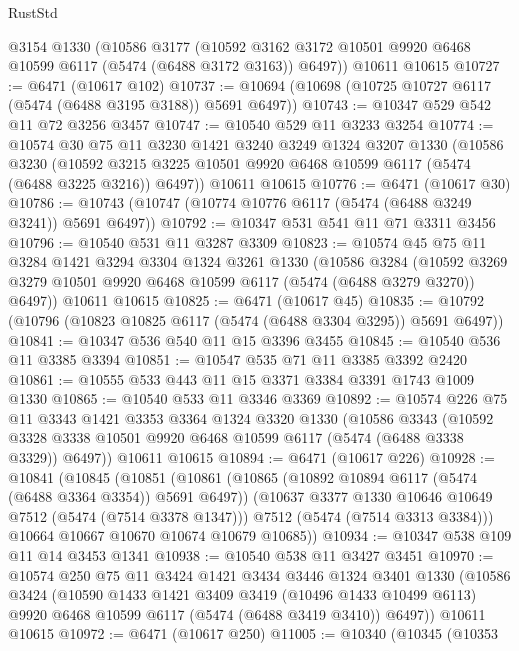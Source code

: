 \begin{lexlean}{RustStd}
\begin{coremodule}
    @3154
    @1330
    (@10586
      @3177
      (@10592 @3162 @3172 @10501 @9920 @6468 @10599 @6117 (@5474 (@6488 @3172 @3163)) @6497))
    @10611
    @10615
@10727 := @6471 (@10617 @102)
@10737 := @10694 (@10698 (@10725 @10727 @6117 (@5474 (@6488 @3195 @3188)) @5691 @6497))
@10743 := @10347 @529 @542 @11 @72 @3256 @3457
@10747 := @10540 @529 @11 @3233 @3254
@10774 := @10574
    @30
    @75
    @11
    @3230
    @1421
    @3240
    @3249
    @1324
    @3207
    @1330
    (@10586
      @3230
      (@10592 @3215 @3225 @10501 @9920 @6468 @10599 @6117 (@5474 (@6488 @3225 @3216)) @6497))
    @10611
    @10615
@10776 := @6471 (@10617 @30)
@10786 := @10743 (@10747 (@10774 @10776 @6117 (@5474 (@6488 @3249 @3241)) @5691 @6497))
@10792 := @10347 @531 @541 @11 @71 @3311 @3456
@10796 := @10540 @531 @11 @3287 @3309
@10823 := @10574
    @45
    @75
    @11
    @3284
    @1421
    @3294
    @3304
    @1324
    @3261
    @1330
    (@10586
      @3284
      (@10592 @3269 @3279 @10501 @9920 @6468 @10599 @6117 (@5474 (@6488 @3279 @3270)) @6497))
    @10611
    @10615
@10825 := @6471 (@10617 @45)
@10835 := @10792 (@10796 (@10823 @10825 @6117 (@5474 (@6488 @3304 @3295)) @5691 @6497))
@10841 := @10347 @536 @540 @11 @15 @3396 @3455
@10845 := @10540 @536 @11 @3385 @3394
@10851 := @10547 @535 @71 @11 @3385 @3392 @2420
@10861 := @10555 @533 @443 @11 @15 @3371 @3384 @3391 @1743 @1009 @1330
@10865 := @10540 @533 @11 @3346 @3369
@10892 := @10574
    @226
    @75
    @11
    @3343
    @1421
    @3353
    @3364
    @1324
    @3320
    @1330
    (@10586
      @3343
      (@10592 @3328 @3338 @10501 @9920 @6468 @10599 @6117 (@5474 (@6488 @3338 @3329)) @6497))
    @10611
    @10615
@10894 := @6471 (@10617 @226)
@10928 := @10841
    (@10845
      (@10851
        (@10861
          (@10865 (@10892 @10894 @6117 (@5474 (@6488 @3364 @3354)) @5691 @6497))
          (@10637 @3377 @1330 @10646 @10649 @7512 (@5474 (@7514 @3378 @1347)))
          @7512
          (@5474 (@7514 @3313 @3384)))
        @10664
        @10667
        @10670
        @10674
        @10679
        @10685))
@10934 := @10347 @538 @109 @11 @14 @3453 @1341
@10938 := @10540 @538 @11 @3427 @3451
@10970 := @10574
    @250
    @75
    @11
    @3424
    @1421
    @3434
    @3446
    @1324
    @3401
    @1330
    (@10586
      @3424
      (@10590
        @1433
        @1421
        @3409
        @3419
        (@10496 @1433 @10499 @6113)
        @9920
        @6468
        @10599
        @6117
        (@5474 (@6488 @3419 @3410))
        @6497))
    @10611
    @10615
@10972 := @6471 (@10617 @250)
@11005 := @10340
    (@10345
      (@10353

\end{coremodule}
\end{lexlean}

